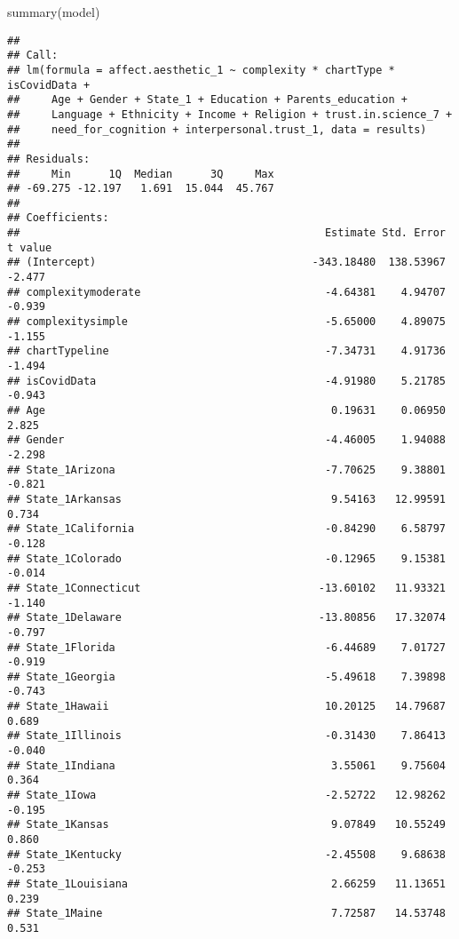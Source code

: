 \documentclass[
]{article}
\newenvironment{Shaded}{\begin{snugshade}}{\end{snugshade}}
\newcommand{\FunctionTok}[1]{\textcolor[rgb]{0.00,0.00,0.00}{#1}}
\newcommand{\NormalTok}[1]{#1}
\begin{document}
\begin{Shaded}
\begin{Highlighting}[]
\FunctionTok{summary}\NormalTok{(model)}
\end{Highlighting}
\end{Shaded}

\begin{verbatim}
## 
## Call:
## lm(formula = affect.aesthetic_1 ~ complexity * chartType * isCovidData + 
##     Age + Gender + State_1 + Education + Parents_education + 
##     Language + Ethnicity + Income + Religion + trust.in.science_7 + 
##     need_for_cognition + interpersonal.trust_1, data = results)
## 
## Residuals:
##     Min      1Q  Median      3Q     Max 
## -69.275 -12.197   1.691  15.044  45.767 
## 
## Coefficients:
##                                                Estimate Std. Error t value
## (Intercept)                                  -343.18480  138.53967  -2.477
## complexitymoderate                             -4.64381    4.94707  -0.939
## complexitysimple                               -5.65000    4.89075  -1.155
## chartTypeline                                  -7.34731    4.91736  -1.494
## isCovidData                                    -4.91980    5.21785  -0.943
## Age                                             0.19631    0.06950   2.825
## Gender                                         -4.46005    1.94088  -2.298
## State_1Arizona                                 -7.70625    9.38801  -0.821
## State_1Arkansas                                 9.54163   12.99591   0.734
## State_1California                              -0.84290    6.58797  -0.128
## State_1Colorado                                -0.12965    9.15381  -0.014
## State_1Connecticut                            -13.60102   11.93321  -1.140
## State_1Delaware                               -13.80856   17.32074  -0.797
## State_1Florida                                 -6.44689    7.01727  -0.919
## State_1Georgia                                 -5.49618    7.39898  -0.743
## State_1Hawaii                                  10.20125   14.79687   0.689
## State_1Illinois                                -0.31430    7.86413  -0.040
## State_1Indiana                                  3.55061    9.75604   0.364
## State_1Iowa                                    -2.52722   12.98262  -0.195
## State_1Kansas                                   9.07849   10.55249   0.860
## State_1Kentucky                                -2.45508    9.68638  -0.253
## State_1Louisiana                                2.66259   11.13651   0.239
## State_1Maine                                    7.72587   14.53748   0.531

\end{verbatim}
\end{document}
